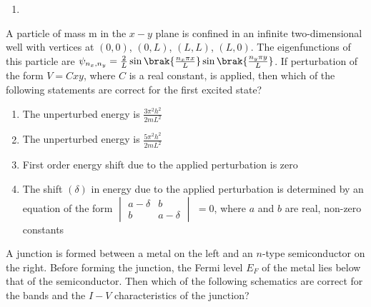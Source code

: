 \begin{enumerate}
\item {}
\end{enumerate}

\item A particle of mass m in the $x-y$ plane is confined in an infinite two-dimensional well with vertices at $(0,0)$, $(0,L)$, $(L,L)$, $(L,0)$. The eigenfunctions of this particle are $\psi_{n_x,n_y} = \frac{2}{L}\sin{\brak{\frac{n_x\pi x}{L}}}\sin{\brak{\frac{n_y\pi y}{L}}}$. If perturbation of the form $V=Cxy$, where $C$ is a real constant, is applied, then which of the following statements are correct for the first excited state?

\begin{enumerate}
\item The unperturbed energy is $\frac{3\pi^2h^2}{2mL^2}$
\item The unperturbed energy is $\frac{5\pi^2h^2}{2mL^2}$
\item First order energy shift due to the applied perturbation is zero
\item The shift $(\delta)$ in energy due to the applied perturbation is determined by an equation of the form $\begin{vmatrix}
a-\delta & b \\
b & a-\delta
\end{vmatrix}$
$=0$, where $a$ and $b$ are real, non-zero constants
\end{enumerate}

\item A junction is formed between a metal on the left and an $n$-type semiconductor on the right. Before forming the junction, the Fermi level $E_F$ of the metal lies below that of the semiconductor. Then which of the following schematics are correct for the bands and the $I-V$ characteristics of the junction?

